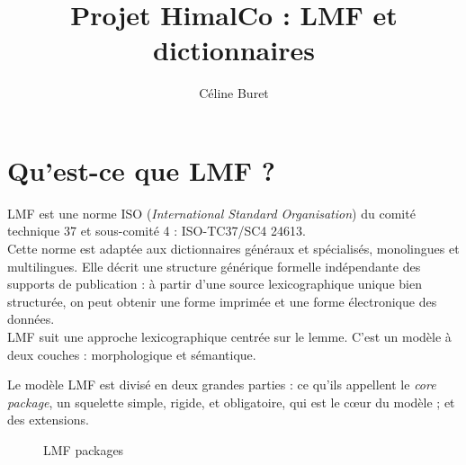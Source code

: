 \documentclass[a4paper,12pt]{article}
\title{Projet HimalCo : LMF et dictionnaires}
\author{C\'eline Buret}
\begin{document}
\maketitle
\newpage
\section{Qu'est-ce que LMF ?}

LMF est une norme ISO (\textit{International Standard Organisation}) du comit\'e technique 37 et sous-comit\'e 4 : ISO-TC37/SC4 24613.\\
Cette norme est adapt\'ee aux dictionnaires g\'en\'eraux et sp\'ecialis\'es, monolingues et multilingues. Elle d\'ecrit une structure g\'en\'erique formelle ind\'ependante des supports de publication : \`a partir d'une source lexicographique unique bien structur\'ee, on peut obtenir une forme imprim\'ee et une forme \'electronique des donn\'ees.\\
LMF suit une approche lexicographique centr\'ee sur le lemme. C'est un mo\-d\`e\-le \`a deux couches : morphologique et s\'emantique.

\pagebreak %
Le mod\`ele LMF est divis\'e en deux grandes parties : ce qu'ils appellent le \textit{core package}, un squelette simple, rigide, et obligatoire, qui est le c\oe{}ur du mod\`ele ; et des extensions.

\begin{figure}[h]
\centerline{}
\caption{LMF packages}
\end{figure}
\end{document}
